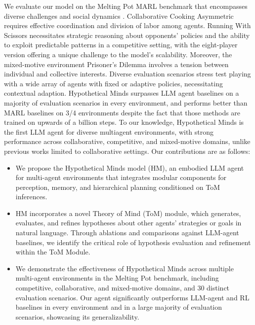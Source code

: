 \documentclass{article} %
\begin{document}
We evaluate our model on the Melting Pot MARL benchmark that encompasses diverse challenges and social dynamics \citep{agapiou2022melting}. Collaborative Cooking Asymmetric requires effective coordination and division of labor among agents. Running With Scissors necessitates strategic reasoning about opponents' policies and the ability to exploit predictable patterns in a competitive setting, with the eight-player version offering a unique challenge to the model's scalability. Moreover, the mixed-motive environment Prisoner's Dilemma involves a tension between individual and collective interests. Diverse evaluation scenarios stress test playing with a wide array of agents with fixed or adaptive policies, necessitating contextual adaption. Hypothetical Minds surpasses LLM agent baselines on a majority of evaluation scenarios in every environment, and performs better than MARL baselines on 3/4 environments despite the fact that those methods are trained on upwards of a billion steps. To our knowledge, Hypothetical Minds is the first LLM agent for diverse multiagent environments, with strong performance across collaborative, competitive, and mixed-motive domains, unlike previous works limited to collaborative settings. Our contributions are as follows:
\vspace{-10pt}
\begin{itemize}
    \item We propose the Hypothetical Minds model (HM), an embodied LLM agent for multi-agent environments that integrates modular components for perception, memory, and hierarchical planning conditioned on ToM inferences. 
    \item HM incorporates a novel Theory of Mind (ToM) module, which generates, evaluates, and refines hypotheses about other agents' strategies or goals in natural language. Through ablations and comparisons against LLM-agent baselines, we identify the critical role of hypothesis evaluation and refinement within the ToM Module.
    \item We demonstrate the effectiveness of Hypothetical Minds across multiple multi-agent environments in the Melting Pot benchmark, including competitive, collaborative, and mixed-motive domains, and 30 distinct evaluation scenarios. Our agent significantly outperforms LLM-agent and RL baselines in every environment and in a large majority of evaluation scenarios, showcasing its generalizability.
\end{itemize}

\end{document}
